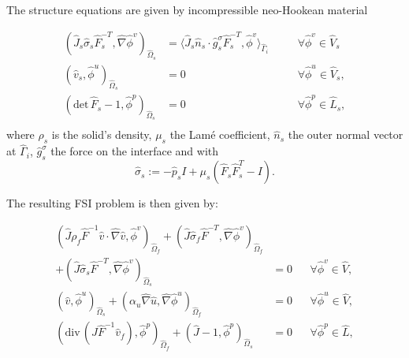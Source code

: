 The structure equations are given by incompressible neo-Hookean material
  
\begin{Problem}
  \begin{equation*}
    \begin{aligned}
      (\hat J_s \hat\sigma_s \hat F_s^{-T},\hat\nabla\hat\phi^v)_{\hat\Omega_s}
      &= \langle\hat J_s\hat n_s\cdot \hat g_s^\sigma\hat
      F_s^{-T},\hat\phi^v  \rangle_{\hat\Gamma_i}
      &&\quad\forall\hat \phi^v\in\hat V_s\\
      (\hat v_s,\hat\phi^u)_{\hat\Omega_s}&=0
      &&\quad\forall\hat \phi^u\in\hat V_s    ,\\
      (\text{det}\,\hat F_s-1,\hat\phi^p)_{\hat\Omega_s} &=0
      &&\quad\forall\hat \phi^p\in\hat L_s,\\
    \end{aligned}
  \end{equation*}
  where $\rho_s$ is the solid's density, $\mu_s$ the Lam\'e
  coefficient, $\hat n_s$ the outer normal vector at $\hat\Gamma_i$, 
  $\hat g_s^\sigma$ the force on the interface and with  
  \[
  \hat\sigma_s:=-\hat p_sI+\mu_s(\hat F_s\hat F_s^T-I).
  \]
\end{Problem}


The resulting FSI problem is then given by: 
\begin{Problem}
  \begin{equation*}
    \begin{aligned}
      (\hat J \rho_f \hat F^{-1}\hat  v\cdot\hat\nabla \hat v,
      \hat\phi^v)_{\hat\Omega_f}
      + (\hat J\hat\sigma_f\hat F^{-T},\hat \nabla\hat\phi^v)_{\hat\Omega_f}\\
      + (\hat J\hat\sigma_s\hat F^{-T},\hat \nabla\hat\phi^v)_{\hat\Omega_s}
      &= 0&&\forall\hat\phi^v\in \hat V,\\
      (\hat v,\hat\phi^u)_{\hat\Omega_s}
      + (\alpha_u \hat \nabla \hat u,\hat \nabla\hat\phi^u)_{\hat\Omega_f}
      &=0&&\forall\hat\phi^u\in \hat V,\\
      (\widehat{\text{div}}\,(\hat J\hat F^{-1}\hat
      v_f),\hat\phi^p)_{\hat\Omega_f} 
      + (\hat J - 1,\hat \phi^p)_{\hat\Omega_s}
      &=0&&\forall\hat \phi^p\in \hat L,
    \end{aligned}
  \end{equation*}  
\end{Problem}

